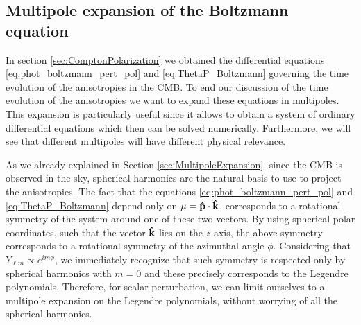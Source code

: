 \subsection{Multipole expansion of the Boltzmann equation}\label{sec:BoltzmannMultipoleExpansion}
In section \ref{sec:ComptonPolarization} we obtained the differential equations \eqref{eq:phot_boltzmann_pert_pol} and \eqref{eq:ThetaP_Boltzmann} governing the time evolution of the anisotropies in the CMB. To end our discussion of the time evolution of the anisotropies we want to expand these equations in multipoles. This expansion is particularly useful since it allows to obtain a system of ordinary differential equations which then can be solved numerically. Furthermore, we will see that different multipoles will have different physical relevance.

As we already explained in Section \ref{sec:MultipoleExpansion}, since the CMB is observed in the sky, spherical harmonics are the natural basis to use to project the anisotropies. The fact that the equations \eqref{eq:phot_boltzmann_pert_pol} and \eqref{eq:ThetaP_Boltzmann} depend only on $\mu=\mathbf{\hat{p}}\cdot\mathbf{\hat{k}}$, corresponds to a rotational symmetry of the system around one of these two vectors. By using spherical polar coordinates, such that the vector $\mathbf{\hat{k}}$ lies on the $z$ axis, the above symmetry corresponds to a rotational symmetry of the azimuthal angle $\phi$. Considering that $Y_{\ell m}\propto e^{im\phi}$, we immediately recognize that such symmetry is respected only by spherical harmonics with $m=0$ and these precisely corresponds to the Legendre polynomials. Therefore, for scalar perturbation, we can limit ourselves to a multipole expansion on the Legendre polynomials, without worrying of all the spherical harmonics.

